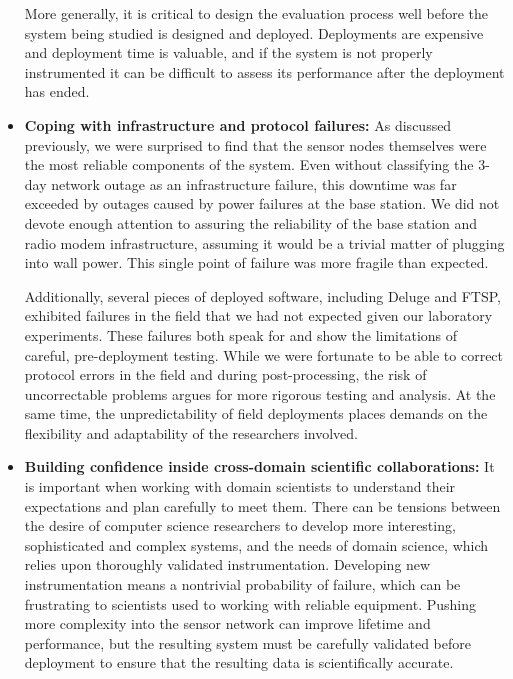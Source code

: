 \begin{itemize}
\hspace{0.25in} More generally, it is critical to design the evaluation
process well before the system being studied is designed and deployed.
Deployments are expensive and deployment time is valuable, and if the system
is not properly instrumented it can be difficult to assess its performance
after the deployment has ended.

\item \textbf{Coping with infrastructure and protocol failures:} As discussed
previously, we were surprised to find that the sensor nodes themselves were
the most reliable components of the system. Even without classifying the
3-day network outage as an infrastructure failure, this downtime was far
exceeded by outages caused by power failures at the base station. We did not
devote enough attention to assuring the reliability of the base station and
radio modem infrastructure, assuming it would be a trivial matter of plugging
into wall power. This single point of failure was more fragile than expected.

\hspace{0.25in} Additionally, several pieces of deployed software, including
Deluge and FTSP, exhibited failures in the field that we had not expected
given our laboratory experiments. These failures both speak for and show the
limitations of careful, pre-deployment testing. While we were fortunate to be
able to correct protocol errors in the field and during post-processing, the
risk of uncorrectable problems argues for more rigorous testing and analysis.
At the same time, the unpredictability of field deployments places demands on
the flexibility and adaptability of the researchers involved.

\item \textbf{Building confidence inside cross-domain scientific
collaborations:} It is important when working with domain scientists to
understand their expectations and plan carefully to meet them. There can be
tensions between the desire of computer science researchers to develop more
interesting, sophisticated and complex systems, and the needs of domain
science, which relies upon thoroughly validated instrumentation. Developing
new instrumentation means a nontrivial probability of failure, which can be
frustrating to scientists used to working with reliable equipment. Pushing
more complexity into the sensor network can improve lifetime and performance,
but the resulting system must be carefully validated before deployment to
ensure that the resulting data is scientifically accurate.


\end{itemize}
